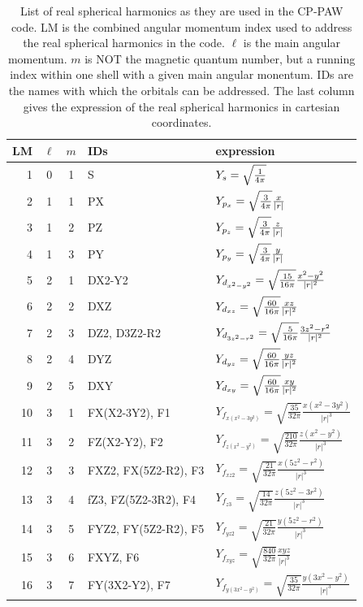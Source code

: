 \documentclass[final,12pt,makeidx,DIV=calc]{article}
\begin{document}
{{{{{{\begin{table}[!hbt]
\caption{\label{tab:realsphericalharmonics}List of real spherical
  harmonics as they are used in the CP-PAW code. LM is the combined
  angular momentum index used to address the real spherical harmonics
  in the code. $\ell$ is the main angular momentum. $m$ is NOT the
  magnetic quantum number, but a running index within one shell with a
  given main angular monentum. IDs are the names with which the
  orbitals can be addressed. The last column gives the expression of
  the real spherical harmonics in cartesian coordinates.}
\begin{center}
\begin{tabular}{|r|c|c|l|l|}
\hline
LM & $\ell$ & $m$ & IDs & expression \\
\hline
1 & 0 & 1 & S   & $Y_s=\sqrt{1\over{4\pi}}$ \\
\hline
2 & 1 & 1 & PX  & $Y_{p_x}=\sqrt{3\over{4\pi}} {x\over{|r|}}$\\
3 & 1 & 2 & PZ  & $Y_{p_z}=\sqrt{3\over{4\pi}} {z\over{|r|}}$\\
4 & 1 & 3 & PY  & $Y_{p_y}=\sqrt{3\over{4\pi}} {y\over{|r|}}$\\
\hline
5 & 2 & 1  & DX2-Y2
                & $Y_{d_{x^2-y^2}}=\sqrt{15\over{16\pi}} {{x^2-y^2}\over{|r|^2}}$\\
6 & 2 & 2 & DXZ & $Y_{d_{xz}}=\sqrt{60\over{16\pi}} {{xz}\over{|r|^2}}$\\
7 & 2 & 3 & DZ2, D3Z2-R2 
                & $Y_{d_{3z^2-r^2}}=\sqrt{5\over{16\pi}} {{3z^2-r^2}\over{|r|^2}}$\\
8 & 2 & 4 & DYZ & $Y_{d_{yz}}=\sqrt{60\over{16\pi}} {{yz}\over{|r|^2}}$\\
9 & 2 & 5 & DXY & $Y_{d_{xy}}=\sqrt{60\over{16\pi}} {{xy}\over{|r|^2}}$\\
\hline
10 & 3 & 1 & FX(X2-3Y2), F1 
   & $Y_{f_{x(x^2-3y^2)}}=\sqrt{\frac{35}{32\pi}} \frac{x(x^2-3y^2)}{|r|^3}$\\
11 & 3 & 2 & FZ(X2-Y2), F2
   & $Y_{f_{z(x^2-y^2)}}=\sqrt{\frac{210}{32\pi}} \frac{z(x^2-y^2)}{|r|^3}$\\
12 & 3 & 3 & FXZ2, FX(5Z2-R2), F3 
   & $Y_{f_{xz2}}=\sqrt{\frac{21}{32\pi}} \frac{x(5z^2-r^2)}{|r|^3}$\\
13 & 3 & 4 & fZ3, FZ(5Z2-3R2), F4
   & $Y_{f_{z3}}=\sqrt{\frac{14}{32\pi}} \frac{z(5z^2-3r^2)}{|r|^3}$\\
14 & 3 & 5 & FYZ2, FY(5Z2-R2), F5
   & $Y_{f_{yz2}}=\sqrt{\frac{21}{32\pi}} \frac{y(5z^2-r^2)}{|r|^3}$\\
15 & 3 & 6 & FXYZ, F6
   & $Y_{f_{xyz}}=\sqrt{\frac{840}{32\pi}} \frac{xyz}{|r|^3}$\\
16 & 3 & 7 & FY(3X2-Y2), F7
   & $Y_{f_{y(3x^2-y^2)}}=\sqrt{\frac{35}{32\pi}} \frac{y(3x^2-y^2)}{|r|^3}$\\
\hline
\end{tabular}
\end{center}
\end{table}


}}}}}}
\end{document}
